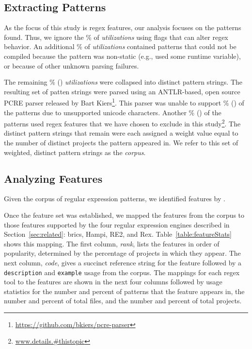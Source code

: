 \subsection{Extracting Patterns}
As the focus of this study is regex features, our analysis focuses on the patterns found. Thus,  we ignore the \%  of \emph{utilizations} using flags that can alter regex behavior.  An additional \% of \emph{utilizations} contained patterns that could not be compiled because the pattern was non-static (e.g., used some runtime variable), or because of other unknown parsing failures.

The remaining \% () \emph{utilizations} were collapsed into  distinct pattern strings.  The resulting set of patten strings were parsed using an ANTLR-based, open source PCRE parser released by Bart Kiers\footnote{\url{https://github.com/bkiers/pcre-parser}}.  This parser was unable to support \% () of the patterns due to unsupported unicode characters.  Another \% () of the patterns used regex features that we have chosen to exclude in this study\footnote{\url{www.details.#thistopic}}.
  The  distinct pattern strings that remain were each assigned a weight value equal to the number of distinct projects the pattern appeared in.  We  refer to this set of weighted, distinct pattern strings as the \emph{corpus}.

\subsection{Analyzing Features}
\label{study:features}
Given the corpus of regular expression patterns, we identified features by .

Once the feature set was established, we mapped the features from the corpus to those features supported by the four regular expression engines described in Section~\ref{sec:related}: brics, Hampi, RE2, and Rex.
Table~\ref{table:featureStats} shows this mapping.
The first column, \emph{rank}, lists the features in order of popularity, determined by the percentage of projects in which they appear. The next column, \emph{code}, gives a succinct reference string for the feature followed by a {\tt description} and {\tt example} usage from the corpus. The mappings for each regex tool to the features are shown in the next four columns followed by usage statistics for the number and percent of patterns that the feature appears in, the number and percent of total files, and the number and percent of total projects.

